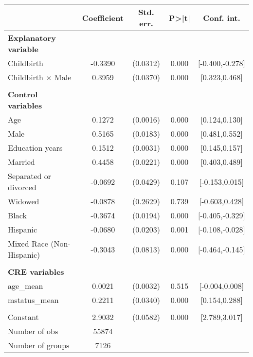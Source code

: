 {
\def\sym#1{\ifmmode^{#1}\else\(^{#1}\)\fi}
\begin{tabular}{l*{1}{cccc}}
\toprule
                    & Coefficient&   Std. err.&       P>|t|&  Conf. int.\\
\midrule
\textbf{Explanatory variable}&            &            &            &            \\
Childbirth          &     -0.3390&    (0.0312)&       0.000&[-0.400,-0.278]\\
Childbirth $\times$ Male&      0.3959&    (0.0370)&       0.000&[0.323,0.468]\\
\\ \textbf{Control variables}&            &            &            &            \\
Age                 &      0.1272&    (0.0016)&       0.000&[0.124,0.130]\\
Male                &      0.5165&    (0.0183)&       0.000&[0.481,0.552]\\
Education years     &      0.1512&    (0.0031)&       0.000&[0.145,0.157]\\
Married             &      0.4458&    (0.0221)&       0.000&[0.403,0.489]\\
Separated or divorced&     -0.0692&    (0.0429)&       0.107&[-0.153,0.015]\\
Widowed             &     -0.0878&    (0.2629)&       0.739&[-0.603,0.428]\\
Black               &     -0.3674&    (0.0194)&       0.000&[-0.405,-0.329]\\
Hispanic            &     -0.0680&    (0.0203)&       0.001&[-0.108,-0.028]\\
Mixed Race (Non-Hispanic)&     -0.3043&    (0.0813)&       0.000&[-0.464,-0.145]\\
\\ \textbf{CRE variables}&            &            &            &            \\
age\_mean            &      0.0021&    (0.0032)&       0.515&[-0.004,0.008]\\
mstatus\_mean        &      0.2211&    (0.0340)&       0.000&[0.154,0.288]\\
                    &            &            &            &            \\
Constant            &      2.9032&    (0.0582)&       0.000&[2.789,3.017]\\
\midrule
Number of obs       &       55874&            &            &            \\
Number of groups    &        7126&            &            &            \\

\end{tabular}}
